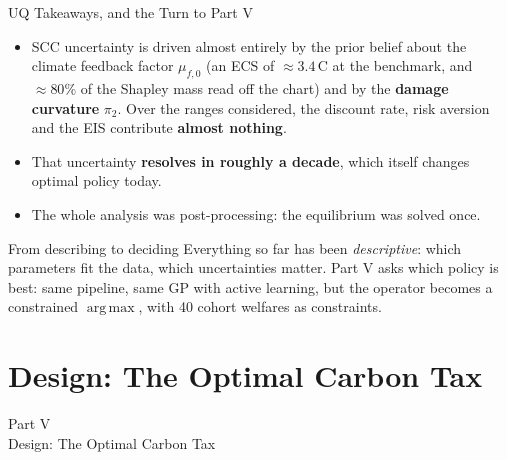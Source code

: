 \documentclass[aspectratio=169,11pt]{beamer}
\newcommand{\emphc}[1]{\textcolor{harvardcrimson}{#1}}
\DeclareMathOperator*{\argmax}{arg\,max}
\begin{document}
\begin{frame}{UQ Takeaways, and the Turn to Part V}
\begin{itemize}\itemsep3pt
  \item SCC uncertainty is driven almost entirely by the prior belief about the \emphc{climate feedback factor} $\mu_{f,0}$ (an ECS of ${\approx}3.4$\,\textdegree C at the benchmark, and ${\approx}80\%$ of the Shapley mass read off the chart) and by the \textbf{damage curvature} $\pi_2$. Over the ranges considered, the discount rate, risk aversion and the EIS contribute \textbf{almost nothing}.
  \item That uncertainty \textbf{resolves in roughly a decade}, which itself changes optimal policy today.
  \item The whole analysis was post-processing: \emphc{the equilibrium was solved once}.
\end{itemize}

\vspace{0.15cm}
\begin{alertblock}{From describing to deciding}
Everything so far has been \emph{descriptive}: which parameters fit the data, which uncertainties matter. \emphc{Part V asks which policy is best}: same pipeline, same GP with active learning, but the operator becomes a \emphc{constrained} $\argmax$, with 40 cohort welfares as constraints.
\end{alertblock}
\end{frame}


\section{Design: The Optimal Carbon Tax}

\begin{frame}{}
\begin{center}
{\Huge \textcolor{uzhblue}{Part V}}\\[0.8em]
{\LARGE Design: The Optimal Carbon Tax}
\end{center}
\end{frame}
\end{document}
